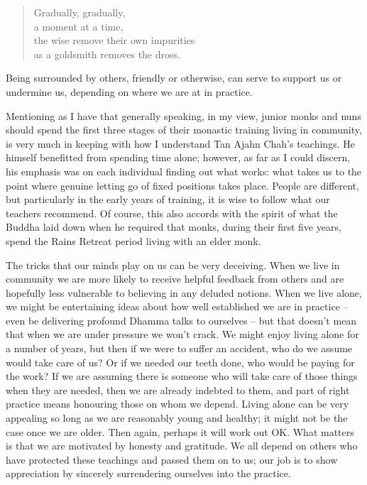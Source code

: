 \begin{quote}
  Gradually, gradually,\\
  a moment at a time,\\
  the wise remove their own impurities\\
  as a goldsmith removes the dross.
\end{quote}

Being surrounded by others, friendly or otherwise, can serve to support
us or undermine us, depending on where we are at in practice.

Mentioning as I have that generally speaking, in my view, junior monks
and nuns should spend the first three stages of their monastic training
living in community, is very much in keeping with how I understand Tan
Ajahn Chah's teachings. He himself benefitted from spending time alone;
however, as far as I could discern, his emphasis was on each individual
finding out what works: what takes us to the point where genuine letting
go of fixed positions takes place. People are different, but
particularly in the early years of training, it is wise to follow what
our teachers recommend. Of course, this also accords with the spirit of
what the Buddha laid down when he required that monks, during their
first five years, spend the Rains Retreat period living with an elder
monk.

The tricks that our minds play on us can be very deceiving. When we live
in community we are more likely to receive helpful feedback from others
and are hopefully less vulnerable to believing in any deluded notions.
When we live alone, we might be entertaining ideas about how well
established we are in practice -- even be delivering profound Dhamma
talks to ourselves -- but that doesn't mean that when we are under
pressure we won't crack. We might enjoy living alone for a number of
years, but then if we were to suffer an accident, who do we assume would
take care of us? Or if we needed our teeth done, who would be paying for
the work? If we are assuming there is someone who will take care of
those things when they are needed, then we are already indebted to them,
and part of right practice means honouring those on whom we depend.
Living alone can be very appealing so long as we are reasonably young
and healthy; it might not be the case once we are older. Then again,
perhaps it will work out OK. What matters is that we are motivated by
honesty and gratitude. We all depend on others who have protected these
teachings and passed them on to us; our job is to show appreciation by
sincerely surrendering ourselves into the practice.

